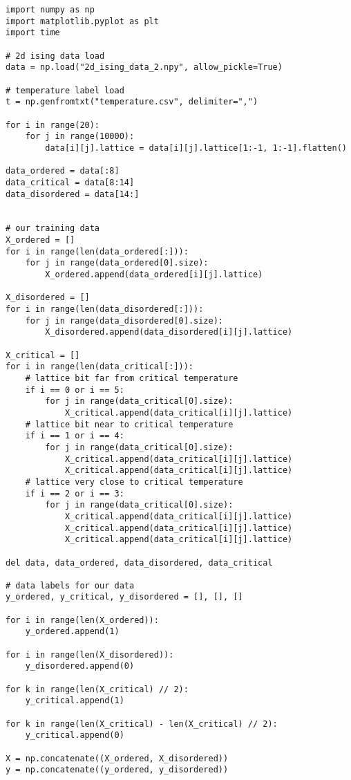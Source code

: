 \begin{verbatim}
import numpy as np
import matplotlib.pyplot as plt
import time

# 2d ising data load
data = np.load("2d_ising_data_2.npy", allow_pickle=True)

# temperature label load
t = np.genfromtxt("temperature.csv", delimiter=",")

for i in range(20):
    for j in range(10000):
        data[i][j].lattice = data[i][j].lattice[1:-1, 1:-1].flatten()

data_ordered = data[:8]
data_critical = data[8:14]
data_disordered = data[14:]


# our training data
X_ordered = []
for i in range(len(data_ordered[:])):
    for j in range(data_ordered[0].size):
        X_ordered.append(data_ordered[i][j].lattice)

X_disordered = []
for i in range(len(data_disordered[:])):
    for j in range(data_disordered[0].size):
        X_disordered.append(data_disordered[i][j].lattice)

X_critical = []
for i in range(len(data_critical[:])):
    # lattice bit far from critical temperature
    if i == 0 or i == 5:
        for j in range(data_critical[0].size):
            X_critical.append(data_critical[i][j].lattice)
    # lattice bit near to critical temperature
    if i == 1 or i == 4:
        for j in range(data_critical[0].size):
            X_critical.append(data_critical[i][j].lattice)
            X_critical.append(data_critical[i][j].lattice)
    # lattice very close to critical temperature
    if i == 2 or i == 3:
        for j in range(data_critical[0].size):
            X_critical.append(data_critical[i][j].lattice)
            X_critical.append(data_critical[i][j].lattice)
            X_critical.append(data_critical[i][j].lattice)

del data, data_ordered, data_disordered, data_critical

# data labels for our data
y_ordered, y_critical, y_disordered = [], [], []

for i in range(len(X_ordered)):
    y_ordered.append(1)

for i in range(len(X_disordered)):
    y_disordered.append(0)

for k in range(len(X_critical) // 2):
    y_critical.append(1)

for k in range(len(X_critical) - len(X_critical) // 2):
    y_critical.append(0)

X = np.concatenate((X_ordered, X_disordered))
y = np.concatenate((y_ordered, y_disordered))


\end{verbatim}
